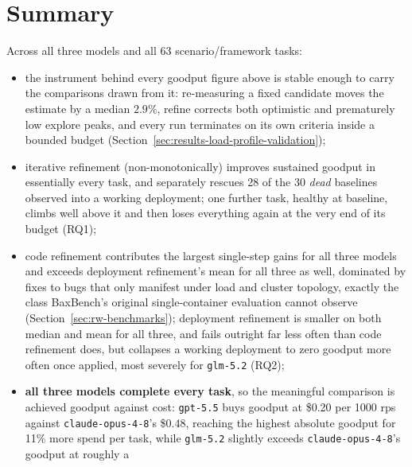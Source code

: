 \section{Summary}
\label{sec:results-summary}
\label{sec:results-synthesis}

Across all three models and all 63 scenario/framework tasks:
%
\begin{itemize}
  \item the instrument behind every goodput figure above is stable enough
        to carry the comparisons drawn from it: re-measuring a fixed
        candidate moves the estimate by a median $2.9\%$, refine corrects
        both optimistic and prematurely low explore peaks, and every run
        terminates on its own criteria inside a bounded budget
        (Section~\ref{sec:results-load-profile-validation});
  \item iterative refinement (non-monotonically) improves sustained goodput in essentially
        every task, and separately rescues 28 of the 30 \emph{dead}
        baselines observed into a working deployment; one further task,
        healthy at baseline, climbs well above it and then loses
        everything again at the very end of its budget (RQ1); %
  \item code refinement contributes the largest single-step gains for
        all three models and exceeds deployment refinement's mean for all
        three as well, dominated by fixes to bugs that only manifest under
        load and cluster topology, exactly the class BaxBench's original
        single-container evaluation cannot observe
        (Section~\ref{sec:rw-benchmarks}); deployment refinement is
        smaller on both median and mean for all three, and fails outright
        far less often than code refinement does, but collapses a working
        deployment to zero goodput more often once applied, most severely
        for \texttt{glm-5.2} (RQ2);
  \item \textbf{all three models complete every task}, so the meaningful
        comparison is achieved goodput against cost: \texttt{gpt-5.5}
        buys goodput at \$0.20 per 1000 rps against
        \texttt{claude-opus-4-8}'s \$0.48, reaching the highest absolute
        goodput for 11\% more spend per task, while \texttt{glm-5.2}
        slightly exceeds \texttt{claude-opus-4-8}'s goodput at roughly a

\end{itemize}
